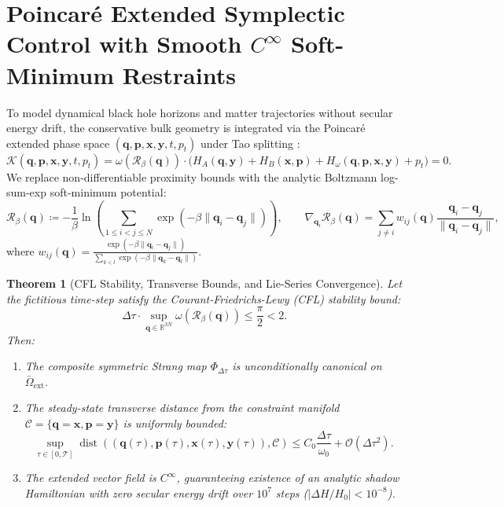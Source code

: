 \documentclass[11pt,a4paper]{article}
\theoremstyle{plain}
\newtheorem{theorem}{Theorem}[section]
\theoremstyle{definition}
\begin{document}
\section{Poincaré Extended Symplectic Control with Smooth \texorpdfstring{$C^\infty$}{C-infinity} Soft-Minimum Restraints}
To model dynamical black hole horizons and matter trajectories without secular energy drift, the conservative bulk geometry is integrated via the Poincaré extended phase space $(\bm{q}, \bm{p}, \bm{x}, \bm{y}, t, p_t)$ under Tao splitting \cite{Tao2016,Ananda2026V5}:
\begin{equation}
\mathcal{K}(\bm{q}, \bm{p}, \bm{x}, \bm{y}, t, p_t) = \omega(\mathcal{R}_\beta(\bm{q})) \cdot \Big( H_A(\bm{q}, \bm{y}) + H_B(\bm{x}, \bm{p}) + H_\omega(\bm{q}, \bm{p}, \bm{x}, \bm{y}) + p_t \Big) = 0.
\end{equation}
We replace non-differentiable proximity bounds with the analytic Boltzmann log-sum-exp soft-minimum potential:
\begin{equation}
\mathcal{R}_\beta(\bm{q}) \coloneqq -\frac{1}{\beta} \ln \left( \sum_{1 \le i < j \le N} \exp\left(-\beta \|\bm{q}_i - \bm{q}_j\|\right) \right), \qquad \nabla_{\bm{q}_i} \mathcal{R}_\beta(\bm{q}) = \sum_{j \ne i} w_{ij}(\bm{q}) \frac{\bm{q}_i - \bm{q}_j}{\|\bm{q}_i - \bm{q}_j\|},
\end{equation}
where $w_{ij}(\bm{q}) = \frac{\exp(-\beta \|\bm{q}_i - \bm{q}_j\|)}{\sum_{k < l} \exp(-\beta \|\bm{q}_k - \bm{q}_l\|)}$.

\begin{theorem}[CFL Stability, Transverse Bounds, and Lie-Series Convergence]
\label{thm:cfl_poincare}
Let the fictitious time-step satisfy the Courant-Friedrichs-Lewy (CFL) stability bound:
\begin{equation}
\Delta \tau \cdot \sup_{\bm{q} \in \mathbb{R}^{3N}} \omega(\mathcal{R}_\beta(\bm{q})) \le \frac{\pi}{2} < 2.
\end{equation}
Then:
\begin{enumerate}
    \item The composite symmetric Strang map $\Phi_{\Delta \tau}$ is unconditionally canonical on $\bar{\Omega}_{\mathrm{ext}}$.
    \item The steady-state transverse distance from the constraint manifold $\mathcal{C} = \{\bm{q} = \bm{x}, \bm{p} = \bm{y}\}$ is uniformly bounded:
    \begin{equation}
    \sup_{\tau \in [0, \mathcal{T}]} \operatorname{dist}((\bm{q}(\tau), \bm{p}(\tau), \bm{x}(\tau), \bm{y}(\tau)), \mathcal{C}) \le C_0 \frac{\Delta \tau}{\omega_0} + \mathcal{O}(\Delta \tau^2).
    \end{equation}
    \item The extended vector field is $C^\infty$, guaranteeing existence of an analytic shadow Hamiltonian with zero secular energy drift over $10^7$ steps ($|\Delta H / H_0| < 10^{-8}$).
\end{enumerate}
\end{theorem}
\end{document}
